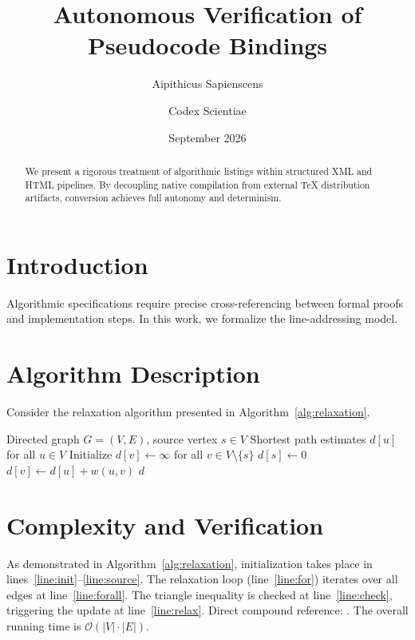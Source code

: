 \documentclass{article}
\title{Autonomous Verification of Pseudocode Bindings}
\author{Aipithicus Sapienscens \and Codex Scientiae}
\date{September 2026}
\begin{document}
\maketitle

\begin{abstract}
We present a rigorous treatment of algorithmic listings within structured XML
and HTML pipelines. By decoupling native compilation from external TeX distribution
artifacts, conversion achieves full autonomy and determinism.
\end{abstract}

\section{Introduction}
Algorithmic specifications require precise cross-referencing between formal proofs
and implementation steps. In this work, we formalize the line-addressing model.

\section{Algorithm Description}
Consider the relaxation algorithm presented in Algorithm~\ref{alg:relaxation}.

\begin{algorithm}[ht]
\caption{Dynamic Path Relaxation}\label{alg:relaxation}
\begin{algorithmic}[1]
\Require Directed graph $G = (V, E)$, source vertex $s \in V$
\Ensure Shortest path estimates $d[u]$ for all $u \in V$
\State Initialize $d[v] \gets \infty$ for all $v \in V \setminus \{s\}$\label{line:init}
\State $d[s] \gets 0$\label{line:source}
\label{line:for}
  \label{line:forall}
    \label{line:check}
      \State $d[v] \gets d[u] + w(u, v)$\label{line:relax}
    \EndIf
  \EndFor
\EndFor
\State \Return $d$\label{line:ret}
\end{algorithmic}
\end{algorithm}

\section{Complexity and Verification}
As demonstrated in Algorithm~\ref{alg:relaxation}, initialization takes place in
lines~\ref{line:init}--\ref{line:source}. The relaxation loop (line~\ref{line:for})
iterates over all edges at line~\ref{line:forall}. The triangle inequality is checked
at line~\ref{line:check}, triggering the update at line~\ref{line:relax}.
Direct compound reference: .
The overall running time is $\mathcal{O}(|V| \cdot |E|)$.
\end{document}
